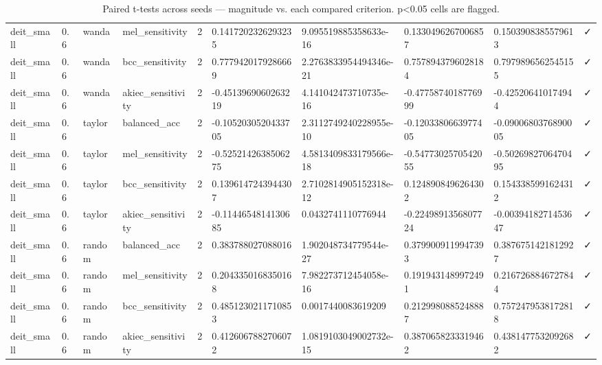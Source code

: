 \begin{table}[t]
\begin{tabular}{llllllllll}
deit\_small & 0.6 & wanda & mel\_sensitivity & 2 & 0.1417202326293235 & 9.095519885358633e-16 & 0.1330496267006857 & 0.1503908385579613 & ✓ \\
deit\_small & 0.6 & wanda & bcc\_sensitivity & 2 & 0.7779420179286669 & 2.2763833954494346e-21 & 0.7578943796028184 & 0.7979896562545155 & ✓ \\
deit\_small & 0.6 & wanda & akiec\_sensitivity & 2 & -0.4513969060263219 & 4.141042473710735e-16 & -0.4775874018776999 & -0.425206410174944 & ✓ \\
deit\_small & 0.6 & taylor & balanced\_acc & 2 & -0.1052030520433705 & 2.3112749240228955e-10 & -0.1203380663977405 & -0.0900680376890005 & ✓ \\
deit\_small & 0.6 & taylor & mel\_sensitivity & 2 & -0.5252142638506275 & 4.5813409833179566e-18 & -0.5477302570542055 & -0.5026982706470495 & ✓ \\
deit\_small & 0.6 & taylor & bcc\_sensitivity & 2 & 0.1396147243944307 & 2.7102814905152318e-12 & 0.1248908496264302 & 0.1543385991624312 & ✓ \\
deit\_small & 0.6 & taylor & akiec\_sensitivity & 2 & -0.1144654814130685 & 0.0432741110776944 & -0.2249891356807724 & -0.0039418271453647 & ✓ \\
deit\_small & 0.6 & random & balanced\_acc & 2 & 0.383788027088016 & 1.902048734779544e-27 & 0.3799009119947393 & 0.3876751421812927 & ✓ \\
deit\_small & 0.6 & random & mel\_sensitivity & 2 & 0.2043350168350168 & 7.982273712454058e-16 & 0.1919431489972491 & 0.2167268846727844 & ✓ \\
deit\_small & 0.6 & random & bcc\_sensitivity & 2 & 0.4851230211710853 & 0.0017440083619209 & 0.2129980885248887 & 0.7572479538172818 & ✓ \\
deit\_small & 0.6 & random & akiec\_sensitivity & 2 & 0.4126067882706072 & 1.0819103049002732e-15 & 0.3870658233319462 & 0.4381477532092682 & ✓ \\
\bottomrule
\end{tabular}
\caption{Paired t-tests across seeds — magnitude vs. each compared criterion. p<0.05 cells are flagged.}
\label{tab:paired_tests}
\end{table}